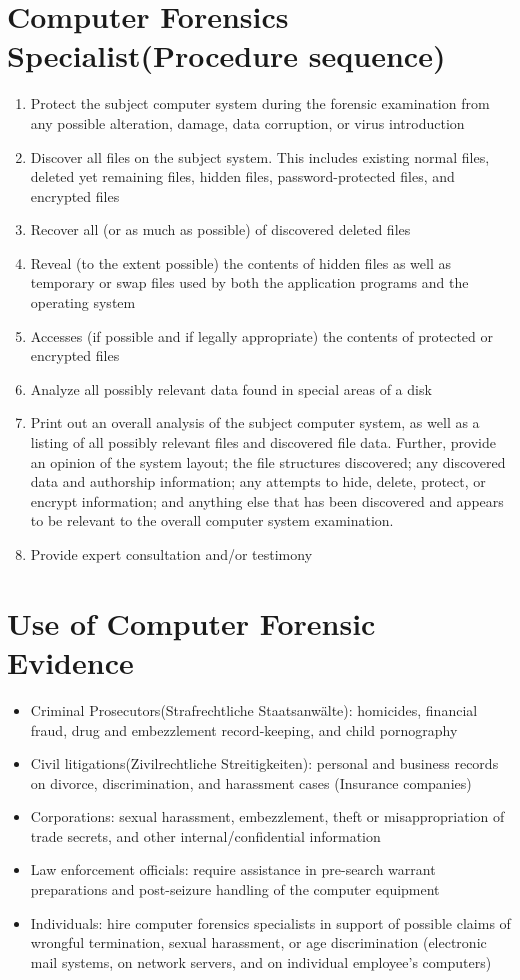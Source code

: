 \documentclass{scrreprt}
\begin{document}
\section{Computer Forensics Specialist(Procedure sequence)}
\begin{enumerate}
\item Protect the subject computer system during the forensic examination from any possible alteration, damage, data corruption, or virus introduction
\item  Discover all files on the subject system. This includes existing normal files, deleted yet remaining files, hidden files, password-protected files, and encrypted files
\item Recover all (or as much as possible) of discovered deleted files
\item Reveal (to the extent possible) the contents of hidden files as well as temporary or swap files used by both the application programs and the operating system
\item Accesses (if possible and if legally appropriate) the contents of protected or encrypted files
\item Analyze all possibly relevant data found in special areas of a disk
\item Print out an overall analysis of the subject computer system, as well as a listing of all possibly relevant files and discovered file data. Further, provide an opinion of the system layout; the file structures discovered; any discovered data and authorship information; any attempts to hide, delete, protect, or encrypt information; and anything else that has been discovered and appears to be relevant to the overall computer system examination.
\item Provide expert consultation and/or testimony
\end{enumerate}
\section{Use of Computer Forensic Evidence}
\begin{itemize}
\item Criminal Prosecutors(Strafrechtliche Staatsanwälte): homicides, financial fraud, drug and embezzlement record-keeping, and child pornography
\item Civil litigations(Zivilrechtliche Streitigkeiten): personal and business records on divorce, discrimination, and harassment cases (Insurance companies)
\item Corporations: sexual harassment, embezzlement, theft or misappropriation of trade secrets, and other internal/confidential information
\item Law enforcement officials: require assistance in pre-search warrant
preparations and post-seizure handling of the computer equipment
\item Individuals: hire computer forensics specialists in support of possible claims of wrongful termination, sexual harassment, or age discrimination (electronic mail systems, on network servers, and on individual employee’s computers)
\end{itemize}
\end{document}
